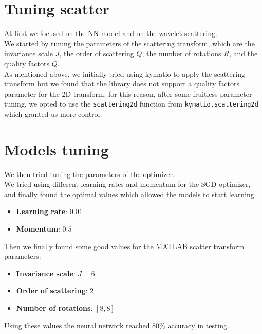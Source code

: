 \documentclass{report}
\begin{document}
\section{Tuning scatter}
At first we focused on the NN model and on the wavelet scattering. \\
We started by tuning the parameters of the scattering transform, which are the invariance scale $J$, the order of scattering $Q$, the number of rotations $R$, and the quality factors $Q$. \\

As mentioned above, we initially tried using kymatio to apply the scattering transform but we found that the library does not support a quality factors parameter for the 2D transform: for this reason, after some fruitless parameter tuning, 
we opted to use the \texttt{scattering2d} function from \texttt{kymatio.scattering2d} which granted us more control. \\

\section{Models tuning}
We then tried tuning the parameters of the optimizer.\\
We tried using different learning rates and momentum for the SGD optimizer, and finally found the optimal values which allowed the models to start learning.
\begin{itemize}
  \item \textbf{Learning rate}: $0.01$ 
  \item \textbf{Momentum}: $0.5$
\end{itemize}

Then we finally found some good values for the MATLAB scatter transform parameters:
\begin{itemize}
  \item \textbf{Invariance scale}: $J=6$
  \item \textbf{Order of scattering}: $2$
  \item \textbf{Number of rotations}: $[8, 8]$
\end{itemize}
Using these values the neural network reached 80\% accuracy in testing.\\
\end{document}
